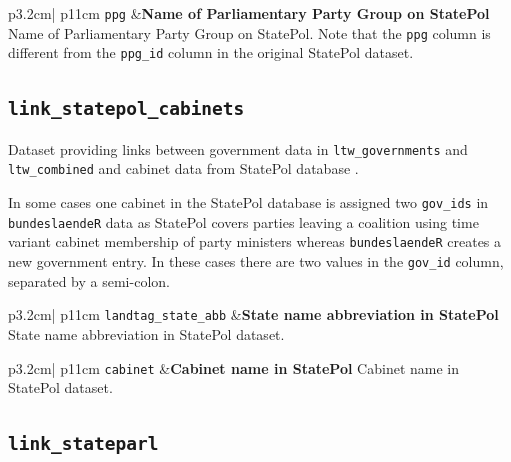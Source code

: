 \documentclass[
  a4paper,
  DIV=11,
  numbers=noendperiod]{scrartcl}
\begin{document}
\begin{longtable*}{p{3.2cm}| p{11cm}}
\texttt{ppg} &\textbf{Name of Parliamentary Party Group on StatePol}\newline 
Name of Parliamentary Party Group on StatePol. Note that the \texttt{ppg} column is different from the \texttt{ppg\_id} column in the original StatePol dataset.
\end{longtable*}

\newpage

\subsection{\texorpdfstring{\texttt{link\_statepol\_cabinets}}{link\_statepol\_cabinets}}\label{link_statepol_cabinets}

Dataset providing links between government data in
\texttt{ltw\_governments} and \texttt{ltw\_combined} and cabinet data
from StatePol database
\parencite{kochStatePolDatenbankMitgliedern2024a}.

In some cases one cabinet in the StatePol database is assigned two
\texttt{gov\_ids} in \texttt{bundeslaendeR} data as StatePol covers
parties leaving a coalition using time variant cabinet membership of
party ministers whereas \texttt{bundeslaendeR} creates a new government
entry. In these cases there are two values in the \texttt{gov\_id}
column, separated by a semi-colon.

\begin{longtable*}{p{3.2cm}| p{11cm}}
\texttt{landtag\_state\_abb} &\textbf{State name abbreviation in StatePol}\newline 
State name abbreviation in StatePol dataset.
\end{longtable*}

\begin{longtable*}{p{3.2cm}| p{11cm}}
\texttt{cabinet} &\textbf{Cabinet name in StatePol}\newline 
Cabinet name in StatePol dataset.
\end{longtable*}

\newpage

\subsection{\texorpdfstring{\texttt{link\_stateparl}}{link\_stateparl}}\label{link_stateparl}
\end{document}
